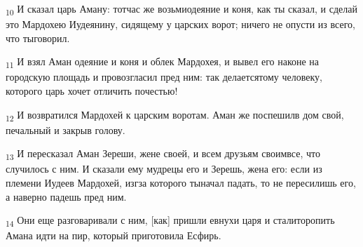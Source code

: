 \begin{tcolorbox}
\textsubscript{10} И сказал царь Аману: тотчас же возьмиодеяние и коня, как ты сказал, и сделай это Мардохею Иудеянину, сидящему у царских ворот; ничего не опусти из всего, что тыговорил.
\end{tcolorbox}
\begin{tcolorbox}
\textsubscript{11} И взял Аман одеяние и коня и облек Мардохея, и вывел его наконе на городскую площадь и провозгласил пред ним: так делаетсятому человеку, которого царь хочет отличить почестью!
\end{tcolorbox}
\begin{tcolorbox}
\textsubscript{12} И возвратился Мардохей к царским воротам. Аман же поспешилв дом свой, печальный и закрыв голову.
\end{tcolorbox}
\begin{tcolorbox}
\textsubscript{13} И пересказал Аман Зереши, жене своей, и всем друзьям своимвсе, что случилось с ним. И сказали ему мудрецы его и Зерешь, жена его: если из племени Иудеев Мардохей, изгза которого тыначал падать, то не пересилишь его, а наверно падешь пред ним.
\end{tcolorbox}
\begin{tcolorbox}
\textsubscript{14} Они еще разговаривали с ним, [как] пришли евнухи царя и сталиторопить Амана идти на пир, который приготовила Есфирь.
\end{tcolorbox}
